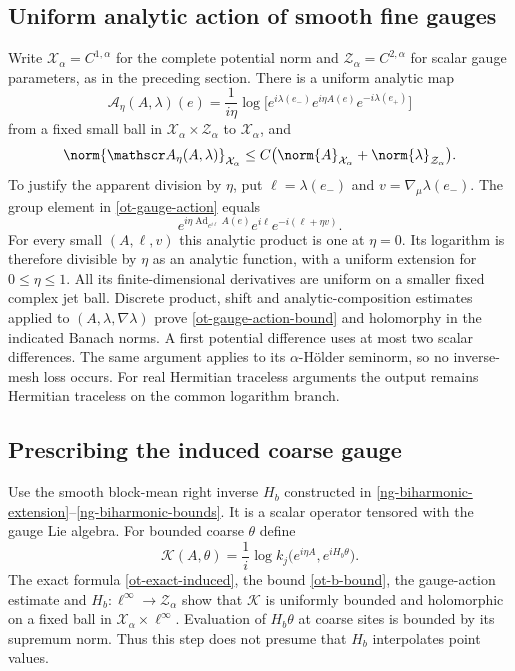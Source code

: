 \subsection{Uniform analytic action of smooth fine gauges}

Write $\mathcal X_\alpha=C^{1,\alpha}$ for the complete
potential norm and $\mathcal Z_\alpha=C^{2,\alpha}$ for scalar
gauge parameters, as in the preceding section. There is a
uniform analytic map
\begin{equation}\label{ot-gauge-action}
 \mathscr A_\eta(A,\lambda)(e)
  =\frac1{i\eta}\log\bigl[
      e^{i\lambda(e_-)}e^{i\eta A(e)}e^{-i\lambda(e_+)}\bigr]
\end{equation}
from a fixed small ball in
$\mathcal X_\alpha\times\mathcal Z_\alpha$ to
$\mathcal X_\alpha$, and
\begin{equation}\label{ot-gauge-action-bound}
 \norm{\mathscr A_\eta(A,\lambda)}_{\mathcal X_\alpha}
       \le C\bigl(\norm{A}_{\mathcal X_\alpha}
                       +\norm{\lambda}_{\mathcal Z_\alpha}\bigr).
\end{equation}
To justify the apparent division by $\eta$, put
$\ell=\lambda(e_-)$ and $v=\nabla_\mu\lambda(e_-)$.
The group element in \eqref{ot-gauge-action} equals
\[
 e^{i\eta\operatorname{Ad}_{e^{i\ell}}A(e)}
        e^{i\ell}e^{-i(\ell+\eta v)}.
\]
For every small $(A,\ell,v)$ this analytic product is one
at $\eta=0$. Its logarithm is therefore divisible by $\eta$
as an analytic function, with a uniform extension for
$0\le\eta\le1$. All its finite-dimensional derivatives are
uniform on a smaller fixed complex jet ball. Discrete product,
shift and analytic-composition estimates applied to
$(A,\lambda,\nabla\lambda)$ prove
\eqref{ot-gauge-action-bound} and holomorphy in the indicated
Banach norms. A first potential difference uses at most two
scalar differences. The same argument applies to its
$\alpha$-H\"older seminorm, so no inverse-mesh loss occurs.
For real Hermitian traceless arguments the output remains
Hermitian traceless on the common logarithm branch.

\subsection{Prescribing the induced coarse gauge}

Use the smooth block-mean right inverse $H_b$ constructed in
\eqref{ng-biharmonic-extension}--\eqref{ng-biharmonic-bounds}.
It is a scalar operator tensored with the gauge Lie algebra.
For bounded coarse $\theta$ define
\begin{equation}\label{ot-K-definition}
 \mathcal K(A,\theta)=\frac1i\log
      k_j\bigl(e^{i\eta A},e^{iH_b\theta}\bigr).
\end{equation}
The exact formula \eqref{ot-exact-induced}, the bound
\eqref{ot-b-bound}, the gauge-action estimate and
$H_b:\ell^\infty\to\mathcal Z_\alpha$ show that
$\mathcal K$ is uniformly bounded and holomorphic on a
fixed ball in $\mathcal X_\alpha\times\ell^\infty$.
Evaluation of $H_b\theta$ at coarse sites is bounded by
its supremum norm. Thus this step does not presume that
$H_b$ interpolates point values.

